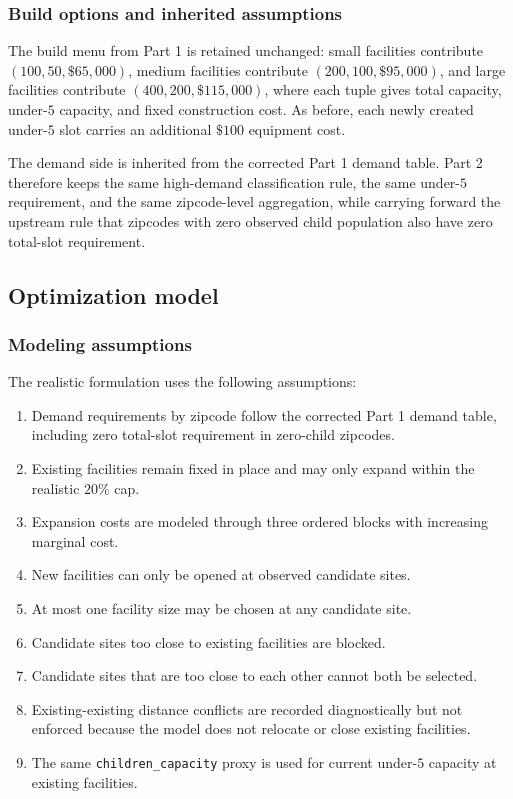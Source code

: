 \documentclass[11pt]{article}
\newcommand{\1}{\mathbb{I}}
\begin{document}
\subsubsection{Build options and inherited assumptions}

The build menu from Part 1 is retained unchanged: small facilities contribute \((100, 50, \$65{,}000)\), medium facilities contribute \((200, 100, \$95{,}000)\), and large facilities contribute \((400, 200, \$115{,}000)\), where each tuple gives total capacity, under-\(5\) capacity, and fixed construction cost. As before, each newly created under-\(5\) slot carries an additional \(\$100\) equipment cost.

The demand side is inherited from the corrected Part 1 demand table. Part 2 therefore keeps the same high-demand classification rule, the same under-\(5\) requirement, and the same zipcode-level aggregation, while carrying forward the upstream rule that zipcodes with zero observed child population also have zero total-slot requirement.

\subsection{Optimization model}

\subsubsection{Modeling assumptions}

The realistic formulation uses the following assumptions:

\begin{enumerate}
    \item Demand requirements by zipcode follow the corrected Part 1 demand table, including zero total-slot requirement in zero-child zipcodes.
    \item Existing facilities remain fixed in place and may only expand within the realistic \(20\%\) cap.
    \item Expansion costs are modeled through three ordered blocks with increasing marginal cost.
    \item New facilities can only be opened at observed candidate sites.
    \item At most one facility size may be chosen at any candidate site.
    \item Candidate sites too close to existing facilities are blocked.
    \item Candidate sites that are too close to each other cannot both be selected.
    \item Existing-existing distance conflicts are recorded diagnostically but not enforced because the model does not relocate or close existing facilities.
    \item The same \texttt{children\_capacity} proxy is used for current under-\(5\) capacity at existing facilities.
\end{enumerate}
\end{document}
